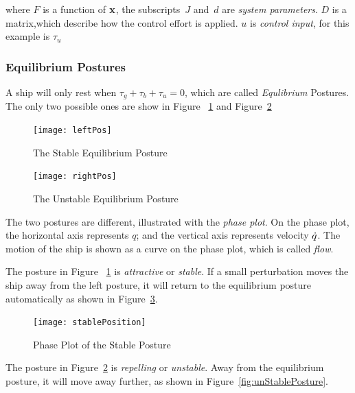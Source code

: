 where 
$F$ is a function of $\mathbf{x}$, the subscripts~$J$ and~$d$ are \emph{system parameters}.
$D$ is a matrix,which describe how the control effort is applied.
$u$ is \emph{control input}, for this example is $\tau_{u}$



\subsubsection*{Equilibrium Postures}
A ship will only rest when $\tau_{g}+\tau_{b}+\tau_{u}=0$, which are called \emph{Equlibrium} Postures.
The only two possible ones are show in Figure ~\ref{fig:ShipEqulibriumStable} and Figure~\ref{fig:ShipEqulibriumUnstable}
\begin{figure}[!htbp]
  \begin{center}
     \texttt{[image: leftPos]}
    \caption{The Stable Equilibrium Posture}
    \label{fig:ShipEqulibriumStable}
  \end{center}
\end{figure}

\begin{figure}[!htbp]
  \begin{center}
     \texttt{[image: rightPos]}
    \caption{The Unstable Equilibrium Posture}
    \label{fig:ShipEqulibriumUnstable}
  \end{center}
\end{figure}



The two postures are different, illustrated with the \emph{phase plot}.
On the phase plot, the horizontal axis represents  $q$; and the vertical axis represents velocity $\dot{q}$. 
The motion of the ship is shown as a curve on the phase plot, which is called \emph{flow}.

The posture in Figure ~\ref{fig:ShipEqulibriumStable} is \emph{attractive} or \emph{stable}.
If a small perturbation moves the ship away from the left posture, it will return to the equilibrium posture automatically as shown in Figure~\ref{fig:StablePosture}.
\begin{figure}[!htbp]
  \begin{center}
      \texttt{[image: stablePosition]}
    \caption{Phase Plot of the Stable Posture}
    \label{fig:StablePosture}
  \end{center}
\end{figure}


The  posture in Figure~\ref{fig:ShipEqulibriumUnstable} is \emph{repelling} or \emph{unstable}.
Away from the equilibrium posture, it will move away further, as shown in Figure~\ref{fig:unStablePosture}.

